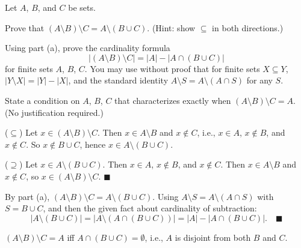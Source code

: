 \documentclass[test,letterpaper]{cs20}
\begin{document}


\begin{problem}

Let $A$, $B$, and $C$ be sets.

\subproblem Prove that $(A \setminus B) \setminus C = A \setminus (B \cup C)$. (Hint: show $\subseteq$ in both directions.)

\subproblem Using part (a), prove the cardinality formula
\[
|(A \setminus B) \setminus C| = |A| - |A \cap (B \cup C)|
\]
for finite sets $A$, $B$, $C$. You may use without proof that for finite sets $X \subseteq Y$, $|Y \setminus X| = |Y| - |X|$, and the standard identity $A \setminus S = A \setminus (A \cap S)$ for any $S$.

\subproblem State a condition on $A$, $B$, $C$ that characterizes exactly when $(A \setminus B) \setminus C = A$. (No justification required.)

\begin{solution}
\subsolution ($\subseteq$) Let $x \in (A \setminus B) \setminus C$. Then $x \in A \setminus B$ and $x \notin C$, i.e., $x \in A$, $x \notin B$, and $x \notin C$. So $x \notin B \cup C$, hence $x \in A \setminus (B \cup C)$.

($\supseteq$) Let $x \in A \setminus (B \cup C)$. Then $x \in A$, $x \notin B$, and $x \notin C$. Then $x \in A \setminus B$ and $x \notin C$, so $x \in (A \setminus B) \setminus C$. $\blacksquare$

\subsolution By part (a), $(A \setminus B) \setminus C = A \setminus (B \cup C)$. Using $A \setminus S = A \setminus (A \cap S)$ with $S = B \cup C$, and then the given fact about cardinality of subtraction:
\[
|A \setminus (B \cup C)| = |A \setminus (A \cap (B \cup C))| = |A| - |A \cap (B \cup C)|. \quad \blacksquare
\]

\subsolution $(A \setminus B) \setminus C = A$ iff $A \cap (B \cup C) = \emptyset$, i.e., $A$ is disjoint from both $B$ and $C$.
\end{solution}

\pagebreak

\end{problem}
\end{document}
